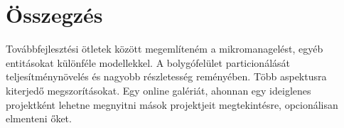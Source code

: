 \chapter{Összegzés}
\label{ch:sum}



Továbbfejlesztési ötletek között megemlíteném a mikromanagelést, egyéb entitásokat különféle modellekkel. A bolygófelület particionálását teljesítménynövelés és nagyobb részletesség reményében. Több aspektusra kiterjedő megszorításokat. Egy online galériát, ahonnan egy ideiglenes projektként lehetne megnyitni mások projektjeit megtekintésre, opcionálisan elmenteni őket.
